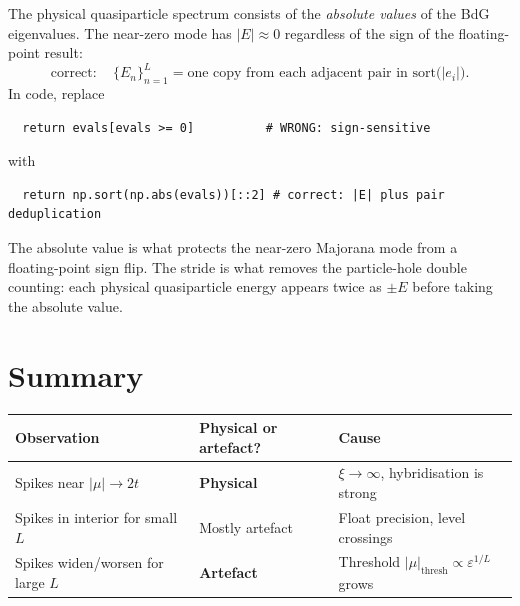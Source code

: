 \documentclass[11pt]{article}
\begin{document}
The physical quasiparticle spectrum consists of the \emph{absolute values}
of the BdG eigenvalues. The near-zero mode has $|E| \approx 0$ regardless
of the sign of the floating-point result:
\begin{equation}
  \text{correct}: \quad
  \{E_n\}_{n=1}^{L}
  = \text{one copy from each adjacent pair in } \text{sort}\bigl(|e_i|\bigr).
\end{equation}
In code, replace
\begin{verbatim}
  return evals[evals >= 0]          # WRONG: sign-sensitive
\end{verbatim}
with
\begin{verbatim}
  return np.sort(np.abs(evals))[::2] # correct: |E| plus pair deduplication
\end{verbatim}
The absolute value is what protects the near-zero Majorana mode from a
floating-point sign flip. The stride is what removes the particle-hole double
counting: each physical quasiparticle energy appears twice as $\pm E$ before
taking the absolute value.

\section{Summary}

\begin{center}
\renewcommand{\arraystretch}{1.4}
\begin{tabular}{lll}
\hline
Observation & Physical or artefact? & Cause \\
\hline
Spikes near $|\mu|\to 2t$ & \textbf{Physical} & $\xi \to \infty$, hybridisation is strong \\
Spikes in interior for small $L$ & Mostly artefact & Float precision, level crossings \\
Spikes widen/worsen for large $L$ & \textbf{Artefact} & Threshold $|\mu|_\text{thresh}\propto\varepsilon^{1/L}$ grows \\
\hline
\end{tabular}
\end{center}
\end{document}
